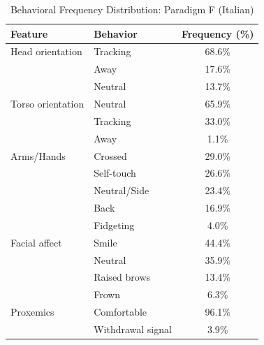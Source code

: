 \begin{table}[ht]
\centering
\caption{Behavioral Frequency Distribution: Paradigm F (Italian)}
\begin{tabular}{llc}
\toprule
Feature & Behavior & Frequency (\%) \\
\midrule
Head orientation & Tracking & 68.6\% \\
 & Away & 17.6\% \\
 & Neutral & 13.7\% \\
Torso orientation & Neutral & 65.9\% \\
 & Tracking & 33.0\% \\
 & Away & 1.1\% \\
Arms/Hands & Crossed & 29.0\% \\
 & Self-touch & 26.6\% \\
 & Neutral/Side & 23.4\% \\
 & Back & 16.9\% \\
 & Fidgeting & 4.0\% \\
Facial affect & Smile & 44.4\% \\
 & Neutral & 35.9\% \\
 & Raised brows & 13.4\% \\
 & Frown & 6.3\% \\
Proxemics & Comfortable & 96.1\% \\
 & Withdrawal signal & 3.9\% \\
\bottomrule
\end{tabular}
\end{table}